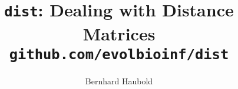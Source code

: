 \documentclass[a4paper]{article}
\begin{document}
\pagestyle{noweb}

\title{\texttt{dist}: Dealing with Distance Matrices\\
\small \texttt{github.com/evolbioinf/dist}}
\author{Bernhard Haubold}
\maketitle
\tableofcontents




\end{document}
